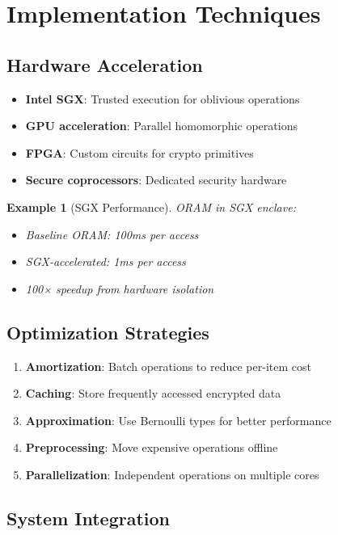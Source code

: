 \documentclass[11pt,final,hidelinks]{article}
\newtheorem{example}[theorem]{Example}
\begin{document}
\section{Implementation Techniques}

\subsection{Hardware Acceleration}

\begin{itemize}
    \item \textbf{Intel SGX}: Trusted execution for oblivious operations
    \item \textbf{GPU acceleration}: Parallel homomorphic operations
    \item \textbf{FPGA}: Custom circuits for crypto primitives
    \item \textbf{Secure coprocessors}: Dedicated security hardware
\end{itemize}

\begin{example}[SGX Performance]
ORAM in SGX enclave:
\begin{itemize}
    \item Baseline ORAM: 100ms per access
    \item SGX-accelerated: 1ms per access
    \item 100× speedup from hardware isolation
\end{itemize}
\end{example}

\subsection{Optimization Strategies}

\begin{enumerate}
    \item \textbf{Amortization}: Batch operations to reduce per-item cost
    \item \textbf{Caching}: Store frequently accessed encrypted data
    \item \textbf{Approximation}: Use Bernoulli types for better performance
    \item \textbf{Preprocessing}: Move expensive operations offline
    \item \textbf{Parallelization}: Independent operations on multiple cores
\end{enumerate}

\subsection{System Integration}
\end{document}
